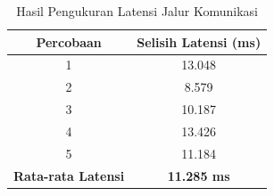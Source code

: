 \begin{table}[t]
\centering
\caption{Hasil Pengukuran Latensi Jalur Komunikasi}
\label{tab:test_latency}
\begin{tabular}{|c|c|}
\hline
\textbf{Percobaan} & \textbf{Selisih Latensi (ms)} \\ \hline
1 & 13.048 \\ \hline
2 & 8.579 \\ \hline
3 & 10.187 \\ \hline
4 & 13.426 \\ \hline
5 & 11.184 \\ \hline
\textbf{Rata-rata Latensi} & \textbf{11.285 ms} \\ \hline
\end{tabular}
\end{table}